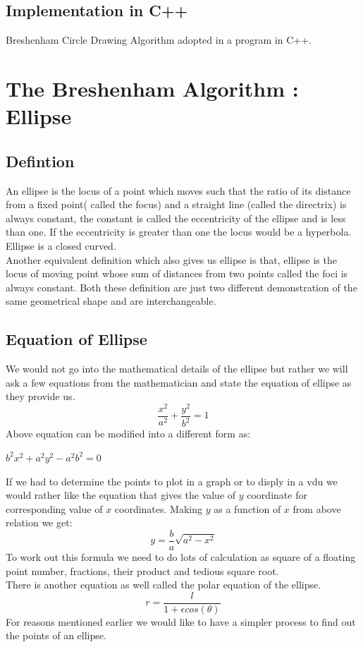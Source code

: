 \documentclass[a4paper,12pt,oneside]{book}
\begin{document}
\section{Implementation in C++}
Breshenham Circle Drawing Algorithm adopted in a program  in C++.

\chapter{The Breshenham Algorithm : Ellipse}
\section{Defintion}
An ellipse is the locus of a point which moves such that the ratio of its distance from a fixed point( called the focus) and a straight line (called the directrix) is always constant, the constant is called the eccentricity of the ellipse and is less than one. If the eccentricity is greater than one the locus would be a hyperbola. Ellipse is a closed curved.\\
Another equivalent definition which also gives us ellipse is that, ellipse is the locus of moving point whose sum of distances from two points called the foci is always constant. Both these definition are just two different demonstration of the same geometrical shape and are interchangeable. 
\section{Equation of Ellipse}
We would not go into the mathematical details of the ellipse but rather we will ask a few equations from the mathematician and state the equation of ellipse as they provide us.
\begin{equation} \label{eq:generalellipse}
	\frac{x^2}{a^2}+\frac{y^2}{b^2}=1
\end{equation}
Above equation can be modified into a different form as:
\begin{center}
	$b^2x^2+a^2y^2-a^2b^2=0$
\end{center}

If we had to determine the points to plot in a graph or to disply in a vdu we would rather like the equation that gives the value of $y$ coordinate for corresponding value of $x$ coordinates. Making $y$ as a function of $x$ from above relation we get:
\begin{equation}
	y=\frac{b}{a}\sqrt{a^2-x^2}
\end{equation}
To work out this formula we need to do lots of calculation as square of a floating point number, fractions, their product and tedious square root.\\
There is another equation as well called the polar equation of the ellipse.
\begin{equation}
	r=\frac{l}{1+\epsilon cos(\theta)}
\end{equation}
 For reasons mentioned earlier we would like to have a simpler process to find out the points of an ellipse.
\end{document}

